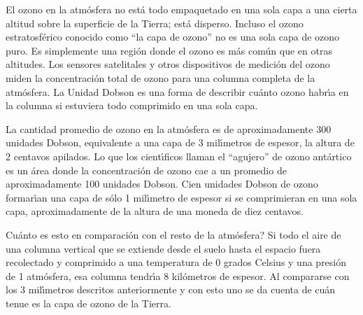 El ozono en la atm\'osfera no est\'a todo empaquetado en una sola capa a una cierta altitud sobre la superficie de la Tierra; est\'a disperso. Incluso el ozono estratosf\'erico conocido como ``la capa de ozono'' no es una sola capa de ozono puro. Es simplemente una regi\'on donde el ozono es m\'as com\'un que en otras altitudes. Los sensores satelitales y otros dispositivos de medici\'on del ozono miden la concentraci\'on total de ozono para una columna completa de la atm\'osfera. La Unidad Dobson es una forma de describir cu\'anto ozono habr\'{\i}a en la columna si estuviera todo comprimido en una sola capa.

La cantidad promedio de ozono en la atm\'osfera es de aproximadamente 300 unidades Dobson, equivalente a una capa de 3 mil\'{\i}metros de espesor, la altura de 2 centavos apilados. Lo que los cient\'{\i}ficos llaman el ``agujero'' de ozono ant\'artico es un \'area donde la concentraci\'on de ozono cae a un promedio de aproximadamente 100 unidades Dobson. Cien unidades Dobson de ozono formar\'{\i}an una capa de s\'olo 1 mil\'{\i}metro de espesor si se comprimieran en una sola capa, aproximadamente de la altura de una moneda de diez centavos.

\textquestiondown Cu\'anto es esto en comparaci\'on con el resto de la atm\'osfera?  Si todo el aire de una columna vertical que se extiende desde el suelo hasta el espacio fuera recolectado y comprimido a una temperatura de 0 grados Celsius y una presi\'on de 1 atm\'osfera, esa columna tendr\'{\i}a 8 kil\'ometros de espesor. Al compararse con los 3 mil\'{\i}metros descritos anteriormente y con esto uno se da cuenta de cu\'an tenue es la capa de ozono de la Tierra.
